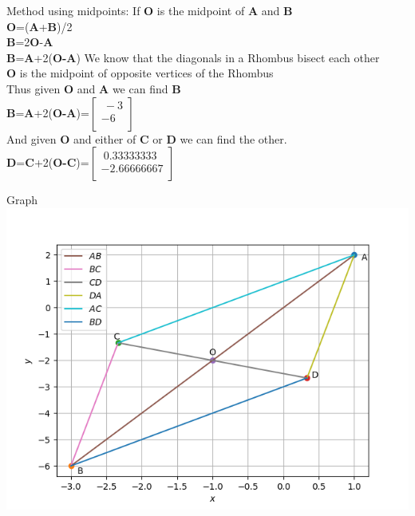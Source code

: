 \documentclass{beamer}
\begin{document}
\begin{frame}{Method using midpoints:}
If \textbf{O} is the midpoint of \textbf{A} and \textbf{B}\\
\textbf{O}=(\textbf{A}+\textbf{B})/2\\
\textbf{B}=2\textbf{O}-\textbf{A}\\
\textbf{B}=\textbf{A}+2(\textbf{O-A})
We know that the diagonals in a Rhombus bisect each other\\
\textbf{O} is the midpoint of opposite vertices of the Rhombus\\
Thus given \textbf{O} and \textbf{A} we can find \textbf{B}\\

\textbf{B}=\textbf{A}+2(\textbf{O-A})=$\begin{bmatrix}
  \ -3 \\ -6 \\

\end{bmatrix} $\\

And given \textbf{O} and either of \textbf{C} or \textbf{D} we can find the other.\\


\textbf{D}=\textbf{C}+2(\textbf{O-C})=$\begin{bmatrix}
  \  0.33333333 \\ -2.66666667 \\

\end{bmatrix} $

\end{frame}

\begin{frame}{Graph}
\centering
\includegraphics[scale=0.6]{Figure_1.png}
    
\end{frame}
\end{document}
